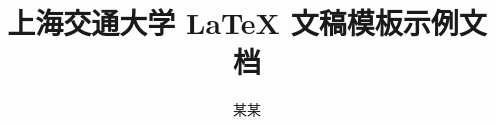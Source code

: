 \documentclass{sjtureport}
\title{上海交通大学 \LaTeX{} 文稿模板示例文档}
\author{某\quad{}某}
\begin{document}
\maketitle

\begin{abstract}
  
\end{abstract}

\tableofcontents



\nocite{*}
\end{document}
